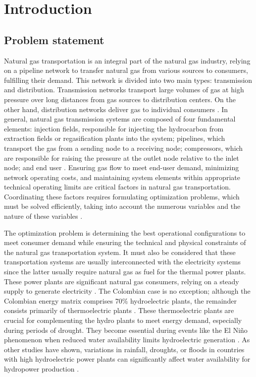 \chapter{Introduction} \label{cap:introduccion}

\section{Problem statement}

Natural gas transportation is an integral part of the natural gas industry, relying on a pipeline network to transfer natural gas from various sources to consumers, fulfilling their demand. This network is divided into two main types: transmission and distribution. Transmission networks transport large volumes of gas at high pressure over long distances from gas sources to distribution centers. On the other hand, distribution networks deliver gas to individual consumers \cite{ABBASI2011xv}. In general, natural gas transmission systems are composed of four fundamental elements: injection fields, responsible for injecting the hydrocarbon from extraction fields or regasification plants into the system; pipelines, which transport the gas from a sending node to a receiving node; compressors, which are responsible for raising the pressure at the outlet node relative to the inlet node; and end user \cite{review}. Ensuring gas flow to meet end-user demand, minimizing network operating costs, and maintaining system elements within appropriate technical operating limits are critical factors in natural gas transportation. Coordinating these factors requires formulating optimization problems, which must be solved efficiently, taking into account the numerous variables and the nature of these variables \cite{Conejo}.


The optimization problem is determining the best operational configurations to meet consumer demand while ensuring the technical and physical constraints of the natural gas transportation system.  It must also be considered that these transportation systems are usually interconnected with the electricity systems since the latter usually require natural gas as fuel for the thermal power plants. These power plants are significant natural gas consumers, relying on a steady supply to generate electricity \cite{Byeon_Van_Hentenryck_2020}. The Colombian case is no exception; although the Colombian energy matrix comprises 70\% hydroelectric plants, the remainder consists primarily of thermoelectric plants \cite{Morcillo_Angulo_Franco_2020a}. These thermoelectric plants are crucial for complementing the hydro plants to meet energy demand, especially during periods of drought. They become essential during events like the El Niño phenomenon when reduced water availability limits hydroelectric generation \cite{droughts_colombia}. As other studies have shown, variations in rainfall, droughts, or floods in countries with high hydroelectric power plants can significantly affect water availability for hydropower production \cite{Cuartas_Cunha_Alves_Parra_Deusdará_Leal_Costa_Molina_Amore_Broedel_Seluchi_et_al_2022}. 

